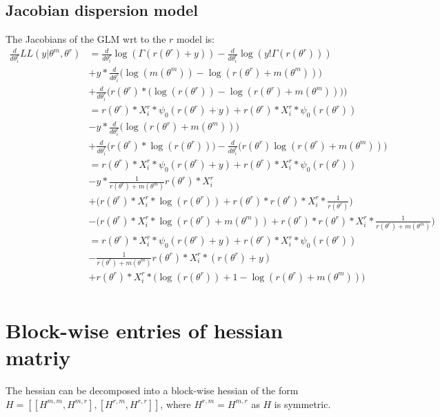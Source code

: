 \documentclass[bibliography=totoc,10pt]{scrartcl}
\begin{document}
\subsection{Jacobian dispersion model}
The Jacobians of the GLM wrt to the $r$ model is:
\begin{equation}
\begin{split}
\frac{d}{d \theta^r_i} LL(y|\theta^m, \theta^r) &= \frac{d}{d \theta^r_i} \log(\Gamma(r(\theta^r)+y)) - \frac{d}{d \theta^r_i} \log(y! \Gamma(r(\theta^r))) \\
&+ y * \frac{d}{d \theta^r_i} \bigg( \log(m(\theta^m)) -\log(r(\theta^r)+m(\theta^m)) \bigg) \\
&+ \frac{d}{d \theta^r_i} \bigg( r(\theta^r) * \bigg( \log(r(\theta^r)) - \log(r(\theta^r)+m(\theta^m)) \bigg) \bigg) \\
&= r(\theta^r) * X^r_{i} * \psi_0(r(\theta^r)+y)+ r(\theta^r) * X^r_{i} * \psi_0(r(\theta^r)) \\
&- y*\frac{d}{d \theta^r_i} \bigg( \log(r(\theta^r)+m(\theta^m)) \bigg) \\
&+ \frac{d}{d \theta^r_i} \bigg( r(\theta^r)*\log(r(\theta^r)) \bigg) - \frac{d}{d \theta^r_i} \bigg( r(\theta^r) \log(r(\theta^r)+m(\theta^m)) \bigg) \\
&= r(\theta^r) * X^r_{i} * \psi_0(r(\theta^r)+y)+ r(\theta^r) * X^r_{i} * \psi_0(r(\theta^r)) \\
&- y*\frac{1}{r(\theta^r)+m(\theta^m)} r(\theta^r) * X^r_{i}   \\
&+  \bigg( r(\theta^r) * X^r_{i}  * \log(r(\theta^r)) + r(\theta^r) * r(\theta^r) * X^r_{i}  * \frac{1}{r(\theta^r)} \bigg) \\
&- \bigg(r(\theta^r) * X^r_{i}  * \log(r(\theta^r)+m(\theta^m)) +  r(\theta^r) * r(\theta^r) * X^r_{i}  * \frac{1}{r(\theta^r)+m(\theta^m)} \bigg) \\
&= r(\theta^r) * X^r_{i} * \psi_0(r(\theta^r)+y)+ r(\theta^r) * X^r_{i} * \psi_0(r(\theta^r)) \\
&- \frac{1}{r(\theta^r)+m(\theta^m)} r(\theta^r) * X^r_{i}  *(r(\theta^r) + y) \\
&+ r(\theta^r) * X^r_{i}  * \bigg( \log(r(\theta^r)) + 1 - \log(r(\theta^r)+m(\theta^m)) \bigg)  \\
\end{split}
\end{equation}

\section{Block-wise entries of hessian matriy}
The hessian can be decomposed into a block-wise hessian of the form $H=[[H^{m,m}, H^{m,r}],[H^{r,m},H^{r,r}]]$, where $H^{r,m}=H^{m,r}$ as $H$ is symmetric.
\end{document}
